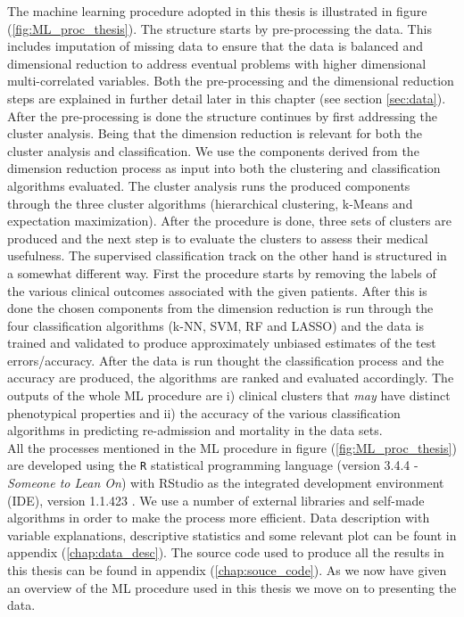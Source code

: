 \documentclass[../thesis.tex]{subfiles}
\begin{document}
\indent The machine learning procedure adopted in this thesis is illustrated in figure (\ref{fig:ML_proc_thesis}). The structure starts by pre-processing the data. This includes imputation of missing data to ensure that the data is balanced and dimensional reduction to address eventual problems with higher dimensional multi-correlated variables. Both the pre-processing and the dimensional reduction steps are explained in further detail later in this chapter (see section \ref{sec:data}). After the pre-processing is done the structure continues by first addressing the cluster analysis. Being that the dimension reduction is relevant for both the cluster analysis and classification. We use the components derived from the dimension reduction process as input into both the clustering and classification algorithms evaluated. The cluster analysis runs the produced components through the three cluster algorithms (hierarchical clustering, k-Means and expectation maximization). After the procedure is done, three sets of clusters are produced and the next step is to evaluate the clusters to assess their medical usefulness. The supervised classification track on the other hand is structured in a somewhat different way. First the procedure starts by removing the labels of the various clinical outcomes associated with the given patients. After this is done the chosen components from the dimension reduction is run through the four classification algorithms (k-NN, SVM, RF and LASSO) and the data is trained and validated to produce approximately unbiased estimates of the test errors/accuracy. After the data is run thought the classification process and the accuracy are produced, the algorithms are ranked and evaluated accordingly. The outputs of the whole ML procedure are i) clinical clusters that \textit{may} have distinct phenotypical properties and ii) the accuracy of the various classification algorithms in predicting re-admission and mortality in the data sets.\\
\indent All the processes mentioned in the ML procedure in figure (\ref{fig:ML_proc_thesis}) are developed using the \texttt{R} statistical programming language (version 3.4.4 - \textit{Someone to Lean On}) \citep{Rsoftware2018} with RStudio as the integrated development environment (IDE), version 1.1.423 \citep{RStudio2018}. We use a number of external libraries and self-made algorithms in order to make the process more efficient. Data description with variable explanations, descriptive statistics and some relevant plot can be fount in appendix (\ref{chap:data_desc}). The source code used to produce all the results in this thesis can be found in appendix (\ref{chap:souce_code}). As we now have given an overview of the ML procedure used in this thesis we move on to presenting the data.
\end{document}
